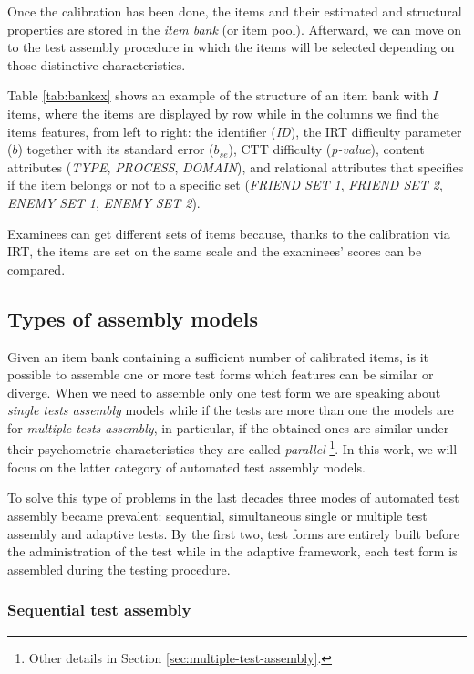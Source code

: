 Once the calibration has been done, the items and their estimated and structural properties are stored in the \emph{item bank} (or item pool). Afterward, we can move on to the test assembly procedure in which the items will be selected depending on those distinctive characteristics.

Table \ref{tab:bankex} shows an example of the structure of an item bank with $I$ items, where the items are displayed by row while in the columns we find the items features, from left to right: the identifier (\textsl{ID}), the IRT difficulty parameter ($b$) together with its standard error ($b_{se}$), CTT difficulty (\textsl{p-value}), content attributes (\textsl{TYPE}, \textsl{PROCESS}, \textsl{DOMAIN}), and relational attributes that specifies if the item belongs or not to a specific set (\textsl{FRIEND SET 1}, \textsl{FRIEND SET 2}, \textsl{ENEMY SET 1}, \textsl{ENEMY SET 2}).

Examinees can get different sets of items because, thanks to the calibration via IRT, the items are set on the same scale and the examinees' scores can be compared.

\subsection{Types of assembly models}\label{sec:assembly-models}

Given an item bank containing a sufficient number of calibrated items, is it possible to assemble one or more test forms which features can be similar or diverge. When we need to assemble only one test form we are speaking about \emph{single tests assembly} models while if the tests are more than one the models are for \emph{multiple tests assembly}, in particular, if the obtained ones are similar under their psychometric characteristics they are called \emph{parallel} \footnote{Other details in Section \ref{sec:multiple-test-assembly}.}.
In this work, we will focus on the latter category of automated test assembly models.

To solve this type of problems in the last decades three modes of automated test assembly became prevalent: sequential, simultaneous single or multiple test assembly and adaptive tests.
By the first two, test forms are entirely built before the administration of the test while in the adaptive framework, each test form is assembled during the testing procedure.

\subsubsection{Sequential test assembly}

